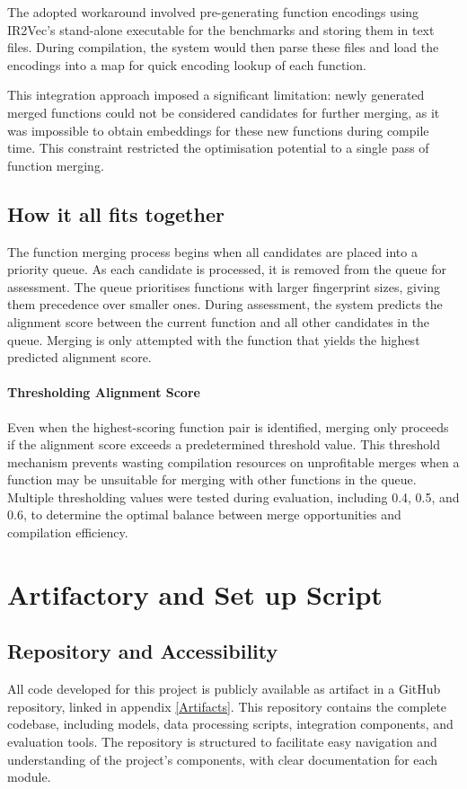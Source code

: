 The adopted workaround involved pre-generating function encodings using IR2Vec's stand-alone executable for the benchmarks and storing them in text files. During compilation, the system would then parse these files and load the encodings into a map for quick encoding lookup of each function.

This integration approach imposed a significant limitation: newly generated merged functions could not be considered candidates for further merging, as it was impossible to obtain embeddings for these new functions during compile time. This constraint restricted the optimisation potential to a single pass of function merging.

\subsection{How it all fits together}
The function merging process begins when all candidates are placed into a priority queue. As each candidate is processed, it is removed from the queue for assessment. The queue prioritises functions with larger fingerprint sizes, giving them precedence over smaller ones. During assessment, the system predicts the alignment score between the current function and all other candidates in the queue. Merging is only attempted with the function that yields the highest predicted alignment score.

\paragraph{Thresholding Alignment Score} Even when the highest-scoring function pair is identified, merging only proceeds if the alignment score exceeds a predetermined threshold value. This threshold mechanism prevents wasting compilation resources on unprofitable merges when a function may be unsuitable for merging with other functions in the queue. Multiple thresholding values were tested during evaluation, including 0.4, 0.5, and 0.6, to determine the optimal balance between merge opportunities and compilation efficiency.

\section{Artifactory and Set up Script} \label{Design:ArtifactoryAndSetUp}
\subsection{Repository and Accessibility}
All code developed for this project is publicly available as artifact in a GitHub repository, linked in appendix \ref{Artifacts}. This repository contains the complete codebase, including models, data processing scripts, integration components, and evaluation tools. The repository is structured to facilitate easy navigation and understanding of the project's components, with clear documentation for each module.

